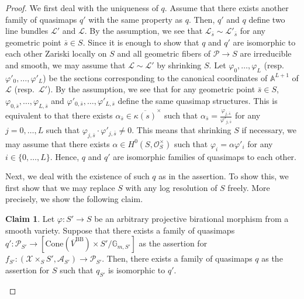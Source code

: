 \documentclass[12pt,twoside]{amsart}
\theoremstyle{definition}
\newtheorem*{claim*}{Claim}
\begin{document}
    \begin{proof}
        We first deal with the uniqueness of $q$.
        Assume that there exists another family of quasimaps $q'$ with the same property as $q$.
        Then, $q'$ and $q$ define two line bundles $\mathscr{L}'$ and $\mathscr{L}$.
        By the assumption, we see that $\mathscr{L}_{\bar{s}}\sim\mathscr{L}'_{\bar{s}}$ for any geometric point $\overline{s}\in S$.
Since it is enough to show that $q$ and $q'$ are isomorphic to each other Zariski locally on $S$ and all geometric fibers of $\mathcal{P}\to S$ are irreducible and smooth, we may assume that $\mathscr{L}\sim\mathscr{L}'$ by shrinking $S$.
Let $\varphi_0,\ldots,\varphi_L$ (resp.~$\varphi'_0,\ldots,\varphi'_L$) be the sections corresponding to the canonical coordinates of $\mathbb{A}^{L+1}$ of $\mathscr{L}$ (resp.~$\mathscr{L}'$).
By the assumption, we see that for any geometric point $\bar{s}\in S$, $\varphi_{0,\bar{s}},\ldots,\varphi_{L,\bar{s}}$ and $\varphi'_{0,\bar{s}},\ldots,\varphi'_{L,\bar{s}}$ define the same quasimap structures.
This is equivalent to that there exists $\alpha_{\bar{s}}\in\overline{\kappa(s)}^{\times}$ such that $\alpha_{\bar{s}}=\frac{\varphi_{j,\bar{s}}}{\varphi'_{j,\bar{s}}}$ for any $j=0,\ldots,L$ such that $\varphi_{j,\bar{s}}\cdot \varphi'_{j,\bar{s}}\ne0$.
This means that shrinking $S$ if necessary, we may assume that there exists $\alpha\in H^0(S,\mathcal{O}_S^{\times})$ such that $\varphi_i=\alpha \varphi'_i$ for any $i\in\{0,\ldots,L\}$.
Hence, $q$ and $q'$ are isomorphic families of quasimaps to each other.

Next, we deal with the existence of such $q$ as in the assertion.
To show this, we first show that we may replace $S$ with any log resolution of $S$ freely.
More precisely, we show the following claim.
\begin{claim*}
    Let $\varphi\colon S'\to S$ be an arbitrary projective birational morphism from a smooth variety.
    Suppose that there exists a family of quasimaps $q'\colon \mathcal{P}_{S'}\to [\mathrm{Cone}(\overline{V}^{\mathrm{BB}})\times S'/\mathbb{G}_{m,S'}]$ as the assertion for $f_{S'}\colon (\mathcal{X}\times_SS',\mathcal{A}_{S'})\to \mathcal{P}_{S'}$.
    Then, there exists a family of quasimaps $q$ as the assertion for $S$ such that $q_{S'}$ is isomorphic to $q'$.
\end{claim*}


\end{proof}
\end{document}
